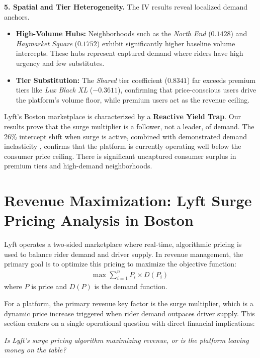 \documentclass[11pt, letterpaper]{article}
\begin{document}
\textbf{5. Spatial and Tier Heterogeneity.} The IV results reveal localized demand anchors.
\begin{itemize}[noitemsep]
\item \textbf{High-Volume Hubs:} Neighborhoods such as the \textit{North End} ($0.1428$) and \textit{Haymarket Square} ($0.1752$) exhibit significantly higher baseline volume intercepts. These hubs represent captured demand where riders have high urgency and few substitutes.
\item \textbf{Tier Substitution:} The \textit{Shared} tier coefficient ($0.8341$) far exceeds premium tiers like \textit{Lux Black XL} ($-0.3611$), confirming that price-conscious users drive the platform's volume floor, while premium users act as the revenue ceiling.
\end{itemize}

\begin{findingbox}
Lyft’s Boston marketplace is characterized by a \textbf{Reactive Yield Trap}. Our results prove that the surge multiplier is a follower, not a leader, of demand. The 26\% intercept shift when surge is active, combined with demonstrated demand inelasticity , confirms that the platform is currently operating well below the consumer price ceiling. There is significant uncaptured consumer surplus in premium tiers and high-demand neighborhoods.
\end{findingbox}






\section{Revenue Maximization: Lyft Surge Pricing Analysis in Boston}
\label{sec:revenue}

Lyft operates a two‑sided marketplace where real‑time, algorithmic pricing is used to balance rider demand and driver supply. In revenue management, the primary goal is to optimize this pricing to maximize the objective function:
\begin{align}
    \text{max } \sum_{i=1}^{n} P_i \times D(P_i)
\end{align}
where $P$ is price and $D(P)$ is the demand function.

For a platform, the primary revenue key factor is the surge multiplier, which is a dynamic price increase triggered when rider demand outpaces driver supply. This section centers on a single operational question with direct financial implications:
\begin{center}
    \textit{Is Lyft’s surge pricing algorithm maximizing revenue, or is the platform leaving money on the table?}
\end{center}
\end{document}
